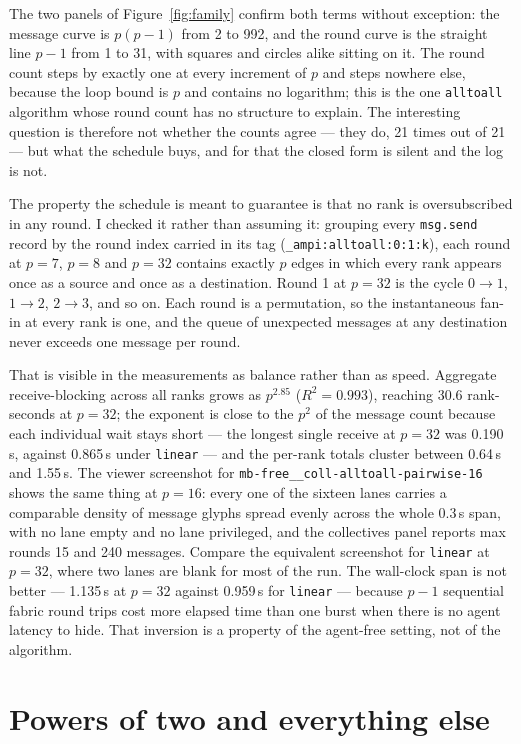 \documentclass[11pt]{article}
\begin{document}
The two panels of Figure~\ref{fig:family} confirm both terms without exception: the message
curve is $p(p-1)$ from 2 to 992, and the round curve is the straight line $p-1$ from 1 to 31,
with squares and circles alike sitting on it. The round count steps by exactly one at every
increment of $p$ and steps nowhere else, because the loop bound is $p$ and contains no
logarithm; this is the one \texttt{alltoall} algorithm whose round count has no structure to
explain. The interesting question is therefore not whether the counts agree --- they do,
21 times out of 21 --- but what the schedule buys, and for that the closed form is silent and
the log is not.

The property the schedule is meant to guarantee is that no rank is oversubscribed in any
round. I checked it rather than assuming it: grouping every \texttt{msg.send} record by the
round index carried in its tag (\verb|_ampi:alltoall:0:1:k|), each round at $p=7$, $p=8$ and
$p=32$ contains exactly $p$ edges in which every rank appears once as a source and once as a
destination. Round 1 at $p=32$ is the cycle $0\to1$, $1\to2$, $2\to3$, and so on. Each round
is a permutation, so the instantaneous fan-in at every rank is one, and the queue of
unexpected messages at any destination never exceeds one message per round.

That is visible in the measurements as balance rather than as speed. Aggregate receive-blocking
across all ranks grows as $p^{2.85}$ ($R^2 = 0.993$), reaching 30.6 rank-seconds at $p=32$;
the exponent is close to the $p^2$ of the message count because each individual wait stays
short --- the longest single receive at $p=32$ was 0.190\,s, against 0.865\,s under
\texttt{linear} --- and the per-rank totals cluster between 0.64\,s and 1.55\,s. The viewer
screenshot for \texttt{mb-free\_\_coll-alltoall-pairwise-16} shows the same thing at $p=16$:
every one of the sixteen lanes carries a comparable density of message glyphs spread evenly
across the whole 0.3\,s span, with no lane empty and no lane privileged, and the collectives
panel reports max rounds 15 and 240 messages. Compare the equivalent screenshot for
\texttt{linear} at $p=32$, where two lanes are blank for most of the run. The wall-clock span
is not better --- 1.135\,s at $p=32$ against 0.959\,s for \texttt{linear} --- because $p-1$
sequential fabric round trips cost more elapsed time than one burst when there is no agent
latency to hide. That inversion is a property of the agent-free setting, not of the algorithm.

\section{Powers of two and everything else}
\end{document}
